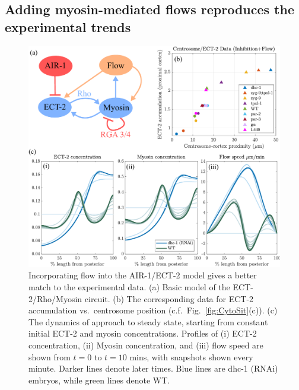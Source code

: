 \documentclass[11pt]{article}
\begin{document}
\subsection{Adding myosin-mediated flows reproduces the experimental trends}
\begin{figure}
\centering
\includegraphics[width=\textwidth]{Glotzer/Fig4/Fig4-crop.pdf}
\caption{\label{fig:CytoWFlow}Incorporating flow into the AIR-1/ECT-2 model gives a better match to the experimental data. (a) Basic model of the ECT-2/Rho/Myosin circuit. (b) The corresponding data for ECT-2 accumulation vs.\ centrosome position (c.f.\ Fig.\ \ref{fig:CytoSit}(c)). (c) The dynamics of approach to steady state, starting from constant initial ECT-2 and myosin concentrations. Profiles of (i) ECT-2 concentration, (ii) Myosin concentration, and (iii) flow speed are shown from $t=0$ to $t=10$ mins, with snapshots shown every minute. Darker lines denote later times. Blue lines are dhc-1 (RNAi) embryos, while green lines denote WT. }
\end{figure}
\end{document}
